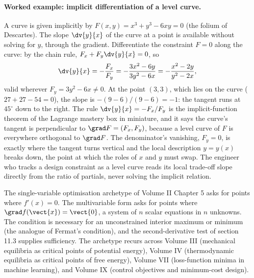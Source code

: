 \paragraph{Worked example: implicit differentiation of a level curve.}
A curve is given implicitly by $F(x, y) = x^{3} + y^{3} - 6 x y = 0$
(the folium of Descartes). The slope $\dv{y}{x}$ of the curve at a point
is available without solving for $y$, through the gradient. Differentiate
the constraint $F = 0$ along the curve: by the chain rule,
$F_{x} + F_{y}\dv{y}{x} = 0$, so
\[
\dv{y}{x} = -\frac{F_{x}}{F_{y}}
= -\frac{3 x^{2} - 6 y}{3 y^{2} - 6 x}
= -\frac{x^{2} - 2 y}{y^{2} - 2 x},
\]
valid wherever $F_{y} = 3 y^{2} - 6 x \neq 0$. At the point $(3, 3)$,
which lies on the curve ($27 + 27 - 54 = 0$), the slope is
$-(9 - 6)/(9 - 6) = -1$: the tangent runs at $45^{\circ}$ down to the
right. The rule $\dv{y}{x} = -F_{x}/F_{y}$ is the implicit-function
theorem of the Lagrange mastery box in miniature, and it says the curve's
tangent is perpendicular to $\grad F = (F_{x}, F_{y})$, because a level
curve of $F$ is everywhere orthogonal to $\grad F$. The denominator's
vanishing, $F_{y} = 0$, is exactly where the tangent turns vertical and
the local description $y = y(x)$ breaks down, the point at which the
roles of $x$ and $y$ must swap. The engineer who tracks a design
constraint as a level curve reads its local trade-off slope directly
from the ratio of partials, never solving the implicit relation.

\begin{archetype}
The single-variable optimisation archetype of Volume II Chapter 5
asks for points where $f'(x) = 0$. The multivariable form asks for
points where $\grad f(\vect{x}) = \vect{0}$, a system of $n$ scalar
equations in $n$ unknowns. The condition is necessary for an
unconstrained interior maximum or minimum (the analogue of Fermat's
condition), and the second-derivative test of section 11.3 supplies
sufficiency. The archetype recurs across Volume III (mechanical
equilibria as critical points of potential energy), Volume IV
(thermodynamic equilibria as critical points of free energy),
Volume VII (loss-function minima in machine learning), and
Volume IX (control objectives and minimum-cost design).
\end{archetype}

